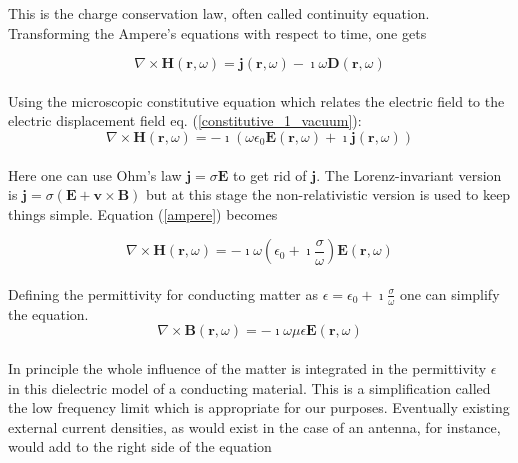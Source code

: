 \documentclass[a4paper,11pt]{thesis}
\begin{document}
This is the charge conservation law, often called continuity equation. Transforming the Ampere's equations with respect to time, one gets

\begin{equation}
\nabla \times \mathbf{H}(\mathbf{r},\omega)=\mathbf{j}(\mathbf{r},\omega)-\imath \omega  \mathbf{D}(\mathbf{r},\omega)
\end{equation}\\

Using the microscopic constitutive equation which relates the electric field to the electric displacement field eq. (\ref{constitutive_1_vacuum}):\\

\begin{equation}
\nabla \times \mathbf{H}(\mathbf{r},\omega)=-\imath  \left(\omega  \epsilon_0 \mathbf{E}(\mathbf{r},\omega)+\imath \mathbf{j}(\mathbf{r},\omega)\right)\label{ampere}
\end{equation}\\

Here one can use Ohm's law $\mathbf{j}=\sigma \mathbf{E}$ to get rid of $\mathbf{j}$. The Lorenz-invariant version is $\mathbf{j}=\sigma (\mathbf{E}+\mathbf{v} \times \mathbf{B})$ but at this stage the non-relativistic version is used to keep things simple. Equation (\ref{ampere}) becomes

\begin{equation}
\nabla \times \mathbf{H}(\mathbf{r},\omega)=-  \imath \omega \left(\epsilon_0 +\imath  \frac{\sigma }{\omega} \right)\mathbf{E}(\mathbf{r},\omega)
\end{equation}\\

Defining the permittivity for conducting matter as $\epsilon=\epsilon_0 +\imath  \frac{\sigma }{\omega}$ one can simplify the equation.\\

\begin{equation}
\nabla \times \mathbf{B}(\mathbf{r},\omega)=-  \imath \omega   \mu \epsilon \mathbf{E}(\mathbf{r},\omega)
\end{equation}\\

In principle the whole influence of the matter is integrated in the permittivity $\epsilon$ in this dielectric model of a conducting material. This is a simplification called the low frequency limit which is appropriate for our purposes. Eventually existing external current densities, as would exist in the case of an antenna, for instance, would add to the right side of the equation\\
\end{document}
